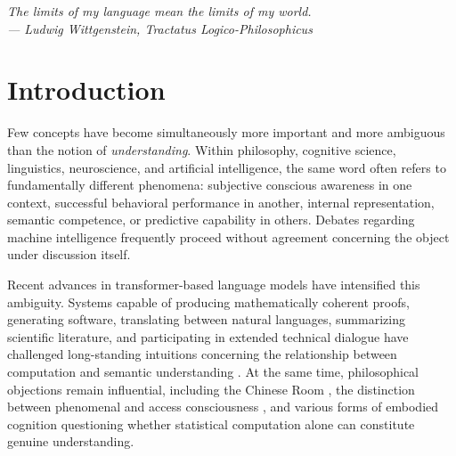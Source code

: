 \documentclass[11pt,twoside,openright]{book}
\numberwithin{equation}{chapter}
\theoremstyle{definition}
\theoremstyle{plain}
\theoremstyle{remark}
\theoremstyle{definition}
\begin{document}
\begin{center}
\end{center}

\vspace{1em}
\begin{flushright}\itshape
The limits of my language mean the limits of my world.\\
\upshape --- Ludwig Wittgenstein, \emph{Tractatus Logico-Philosophicus}
\end{flushright}
\vspace{1em}

\section{Introduction}

Few concepts have become simultaneously more important and more ambiguous
than the notion of \emph{understanding}. Within philosophy, cognitive
science, linguistics, neuroscience, and artificial intelligence, the same
word often refers to fundamentally different phenomena: subjective
conscious awareness in one context, successful behavioral performance in
another, internal representation, semantic competence, or predictive
capability in others. Debates regarding machine intelligence frequently
proceed without agreement concerning the object under discussion itself.

Recent advances in transformer-based language models have intensified
this ambiguity. Systems capable of producing mathematically coherent
proofs, generating software, translating between natural languages,
summarizing scientific literature, and participating in extended
technical dialogue have challenged long-standing intuitions concerning the
relationship between computation and semantic understanding
\cite{Vaswani2017,Brown2020,OpenAI2023}. At the same time, philosophical
objections remain influential, including the Chinese Room \cite{Searle1980},
the distinction between phenomenal and access consciousness
\cite{Block1995}, and various forms of embodied cognition questioning
whether statistical computation alone can constitute genuine
understanding.
\end{document}
